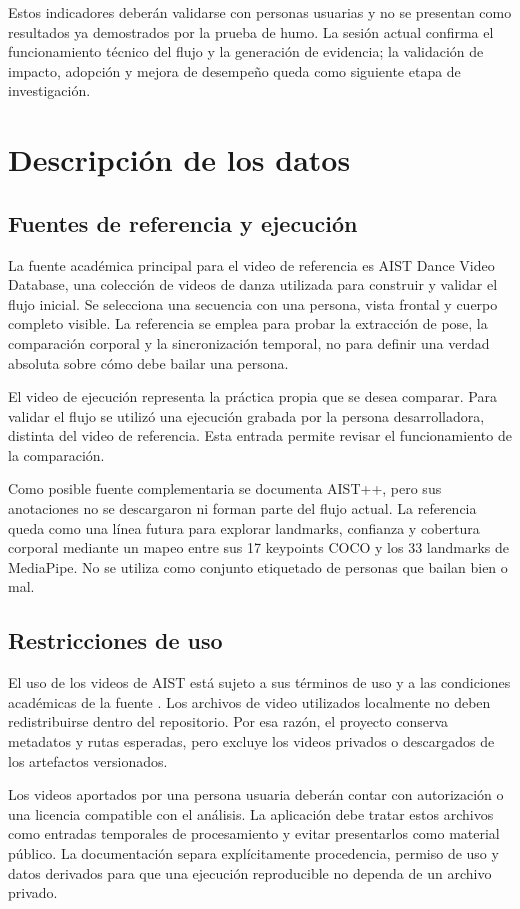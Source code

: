 \documentclass[12pt,a4paper]{article}
\begin{document}
Estos indicadores deberán validarse con personas usuarias y no se presentan como resultados ya demostrados por la prueba de humo. La sesión actual confirma el funcionamiento técnico del flujo y la generación de evidencia; la validación de impacto, adopción y mejora de desempeño queda como siguiente etapa de investigación.

\section{Descripción de los datos}
\subsection{Fuentes de referencia y ejecución}
La fuente académica principal para el video de referencia es AIST Dance Video Database, una colección de videos de danza utilizada para construir y validar el flujo inicial. Se selecciona una secuencia con una persona, vista frontal y cuerpo completo visible. La referencia se emplea para probar la extracción de pose, la comparación corporal y la sincronización temporal, no para definir una verdad absoluta sobre cómo debe bailar una persona.

El video de ejecución representa la práctica propia que se desea comparar. Para validar el flujo se utilizó una ejecución grabada por la persona desarrolladora, distinta del video de referencia. Esta entrada permite revisar el funcionamiento de la comparación.

Como posible fuente complementaria se documenta AIST++, pero sus anotaciones no se descargaron ni forman parte del flujo actual. La referencia queda como una línea futura para explorar landmarks, confianza y cobertura corporal mediante un mapeo entre sus 17 keypoints COCO y los 33 landmarks de MediaPipe. No se utiliza como conjunto etiquetado de personas que bailan bien o mal.
\subsection{Restricciones de uso}
El uso de los videos de AIST está sujeto a sus términos de uso y a las condiciones académicas de la fuente \cite{aist,aistterms}. Los archivos de video utilizados localmente no deben redistribuirse dentro del repositorio. Por esa razón, el proyecto conserva metadatos y rutas esperadas, pero excluye los videos privados o descargados de los artefactos versionados.

Los videos aportados por una persona usuaria deberán contar con autorización o una licencia compatible con el análisis. La aplicación debe tratar estos archivos como entradas temporales de procesamiento y evitar presentarlos como material público. La documentación separa explícitamente procedencia, permiso de uso y datos derivados para que una ejecución reproducible no dependa de un archivo privado.
\end{document}
